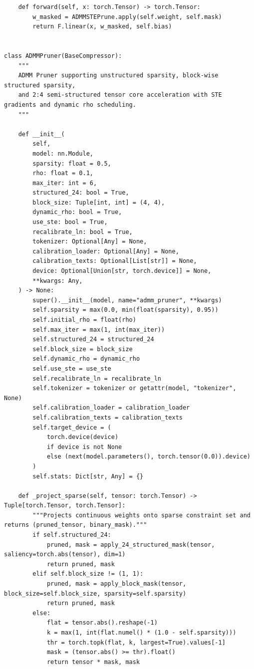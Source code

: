 \begin{lstlisting}
    def forward(self, x: torch.Tensor) -> torch.Tensor:
        w_masked = ADMMSTEPrune.apply(self.weight, self.mask)
        return F.linear(x, w_masked, self.bias)


class ADMMPruner(BaseCompressor):
    """
    ADMM Pruner supporting unstructured sparsity, block-wise structured sparsity,
    and 2:4 semi-structured tensor core acceleration with STE gradients and dynamic rho scheduling.
    """

    def __init__(
        self,
        model: nn.Module,
        sparsity: float = 0.5,
        rho: float = 0.1,
        max_iter: int = 6,
        structured_24: bool = True,
        block_size: Tuple[int, int] = (4, 4),
        dynamic_rho: bool = True,
        use_ste: bool = True,
        recalibrate_ln: bool = True,
        tokenizer: Optional[Any] = None,
        calibration_loader: Optional[Any] = None,
        calibration_texts: Optional[List[str]] = None,
        device: Optional[Union[str, torch.device]] = None,
        **kwargs: Any,
    ) -> None:
        super().__init__(model, name="admm_pruner", **kwargs)
        self.sparsity = max(0.0, min(float(sparsity), 0.95))
        self.initial_rho = float(rho)
        self.max_iter = max(1, int(max_iter))
        self.structured_24 = structured_24
        self.block_size = block_size
        self.dynamic_rho = dynamic_rho
        self.use_ste = use_ste
        self.recalibrate_ln = recalibrate_ln
        self.tokenizer = tokenizer or getattr(model, "tokenizer", None)
        self.calibration_loader = calibration_loader
        self.calibration_texts = calibration_texts
        self.target_device = (
            torch.device(device)
            if device is not None
            else (next(model.parameters(), torch.tensor(0.0)).device)
        )
        self.stats: Dict[str, Any] = {}

    def _project_sparse(self, tensor: torch.Tensor) -> Tuple[torch.Tensor, torch.Tensor]:
        """Projects continuous weights onto sparse constraint set and returns (pruned_tensor, binary_mask)."""
        if self.structured_24:
            pruned, mask = apply_24_structured_mask(tensor, saliency=torch.abs(tensor), dim=1)
            return pruned, mask
        elif self.block_size != (1, 1):
            pruned, mask = apply_block_mask(tensor, block_size=self.block_size, sparsity=self.sparsity)
            return pruned, mask
        else:
            flat = tensor.abs().reshape(-1)
            k = max(1, int(flat.numel() * (1.0 - self.sparsity)))
            thr = torch.topk(flat, k, largest=True).values[-1]
            mask = (tensor.abs() >= thr).float()
            return tensor * mask, mask


\end{lstlisting}
